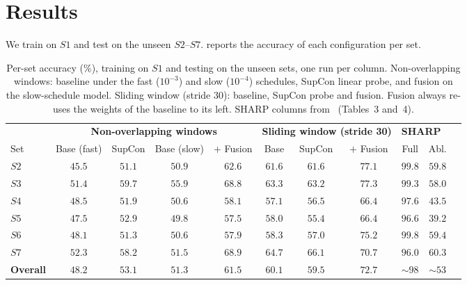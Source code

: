 
\section{Results}
\label{sec:results}

We train on $S1$ and test on the unseen $S2$--$S7$.
 reports the accuracy of each configuration per set.

\begin{table}[!h]
  \centering
  \caption{Per-set accuracy (\%), training on $S1$ and testing on the unseen
  sets, one run per column. Non-overlapping windows: baseline under the fast
  ($10^{-3}$) and slow ($10^{-4}$) schedules, SupCon linear probe, and fusion on
  the slow-schedule model. Sliding window (stride $30$): baseline, SupCon probe
  and fusion. Fusion always re-uses the weights of the baseline to its left.
  SHARP columns from~\cite{sharp} (Tables~3 and~4).}
  \label{tab:compare}
  \setlength{\tabcolsep}{5pt}
  \footnotesize
  \begin{tabular}{@{}lcccccccccc@{}}
    \toprule
     & \multicolumn{4}{c}{\textbf{Non-overlapping windows}}
     & \multicolumn{3}{c}{\textbf{Sliding window (stride 30)}}
     & \multicolumn{2}{c}{\textbf{SHARP~\cite{sharp}}}\\
    \cmidrule(lr){2-5}\cmidrule(lr){6-8}\cmidrule(lr){9-10}
    Set & Base (fast) & SupCon & Base (slow) & $+$ Fusion
        & Base & SupCon & $+$ Fusion & Full & Abl.\\
    \midrule
    $S2$ & $45.5$ & $51.1$ & $50.9$ & $62.6$ & $61.6$ & $61.6$ & $77.1$ & $99.8$ & $59.8$\\
    $S3$ & $51.4$ & $59.7$ & $55.9$ & $68.8$ & $63.3$ & $63.2$ & $77.3$ & $99.3$ & $58.0$\\
    $S4$ & $48.5$ & $51.9$ & $50.6$ & $58.1$ & $57.1$ & $56.5$ & $66.4$ & $97.6$ & $43.5$\\
    $S5$ & $47.5$ & $52.9$ & $49.8$ & $57.5$ & $58.0$ & $55.4$ & $66.4$ & $96.6$ & $39.2$\\
    $S6$ & $48.1$ & $51.3$ & $50.6$ & $57.9$ & $58.3$ & $57.0$ & $75.2$ & $99.8$ & $59.4$\\
    $S7$ & $52.3$ & $58.2$ & $51.5$ & $68.9$ & $64.7$ & $66.1$ & $70.7$ & $96.0$ & $60.3$\\
    \midrule
    \textbf{Overall} & $48.2$ & $53.1$ & $51.3$ & $61.5$ & $60.1$ & $59.5$ &
    $\mathbf{72.7}$ & $\sim\!98$ & $\sim\!53$\\
    \bottomrule
  \end{tabular}
\end{table}


